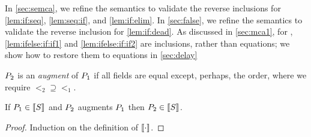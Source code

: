 In \textsection\ref{sec:semca}, we refine the semantics to validate the
reverse inclusions for \eqref{lem:if:seq}, \eqref{lem:seq:if}, and
\eqref{lem:if:elim}.
In \textsection\ref{sec:false}, we refine the semantics to validate the
reverse inclusion for \eqref{lem:if:dead}.
As discussed in \textsection\ref{sec:mca1}, for \PwTmca{},
\eqref{lem:ifelse:if:if1} and \eqref{lem:ifelse:if:if2} are 
inclusions, rather than equations; we show how to restore them to equations
in \textsection\ref{sec:delay}
\begin{definition}
  \label{def:augment}
  $P_2$ is an \emph{augment} of $P_1$ if all fields are equal except,
  perhaps, the order, where we require ${\lt_2}\supseteq{\lt_1}$.
\end{definition}
\begin{lemma}
  If $\aPS_1\in\sembase{\aCmd}$ and $P_2$  augments $P_1$ then $\aPS_2\in\sembase{\aCmd}$.

  \vspace{-.5\baselineskip}
  \begin{proof}
    Induction on the definition of $\sembase{}$.
  \end{proof}
\end{lemma}






